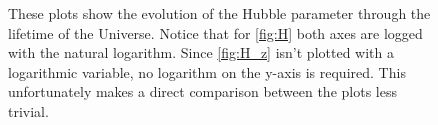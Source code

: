 \documentclass[a4paper,norsk, 10pt]{article}
\begin{document}
\begin{figure}[ht]
     \centering
     \caption{These plots show the evolution of the Hubble parameter through the lifetime of the Universe. Notice that for \ref{fig:H} both axes are logged with the natural logarithm. Since \ref{fig:H_z} isn't plotted with a logarithmic variable, no logarithm on the y-axis is required. This unfortunately makes a direct comparison between the plots less trivial.}
     \label{fig:Hs}
  
\end{figure}
\end{document}
